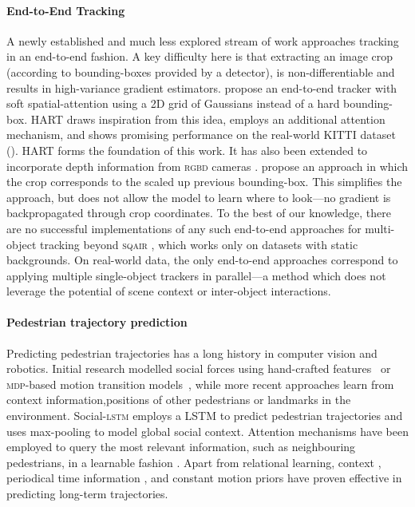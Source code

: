  \paragraph{End-to-End Tracking} A newly established and much less explored stream of work approaches tracking in an end-to-end fashion. A key difficulty here is that extracting an image crop (according to bounding-boxes provided by a detector), is non-differentiable and results in high-variance gradient estimators.
 \citet{Kahou2015ratm} propose an end-to-end tracker with soft spatial-attention using a 2D grid of Gaussians instead of a hard bounding-box. \Gls{HART} draws inspiration from this idea, employs an additional attention mechanism, and shows promising performance on the real-world KITTI dataset ().
 \Gls{HART} forms the foundation of this work. It has also been extended to incorporate depth information from \textsc{rgbd} cameras \citep{Danesh2019deep}. \citet{Gordon2018re3} propose an approach in which the crop corresponds to the scaled up previous bounding-box. This simplifies the approach, but does not allow the model to learn where to look---\ie no gradient is backpropagated through crop coordinates.
 To the best of our knowledge, there are no successful implementations of any such end-to-end approaches for multi-object tracking beyond \textsc{sqair} \citep{Kosiorek2018sqair}, which works only on datasets with static backgrounds. On real-world data, the only end-to-end approaches correspond to applying multiple single-object trackers in parallel---a method which does not leverage the potential of scene context or inter-object interactions. 

\paragraph{Pedestrian trajectory prediction} 
Predicting pedestrian trajectories has a long history in computer vision and robotics.
Initial research modelled social forces using hand-crafted features~\citep{Lerner2007crowds,Pellegrini2009eth,Trautman2010unfreezing,Yamaguchi2011you} or \textsc{mdp}-based motion transition models~\citep{Rudenko2018joint}, while more recent approaches learn from context information,\eg positions of other pedestrians or landmarks in the environment. Social-\textsc{lstm} \citep{Alahi2016social} employs a \gls{LSTM} to predict pedestrian trajectories and uses max-pooling to model global social context.
Attention mechanisms have been employed to query the most relevant information, such as neighbouring pedestrians, in a learnable fashion  \citep{Su2016crowd, Fernando2017soft, Sadeghian2019sophie}. 
Apart from relational learning, context \citep{Varshneya2017human}, periodical time information \citep{Sun20183dof}, and constant motion priors \citep{Scholler2019simpler} have proven effective in predicting long-term trajectories. 

